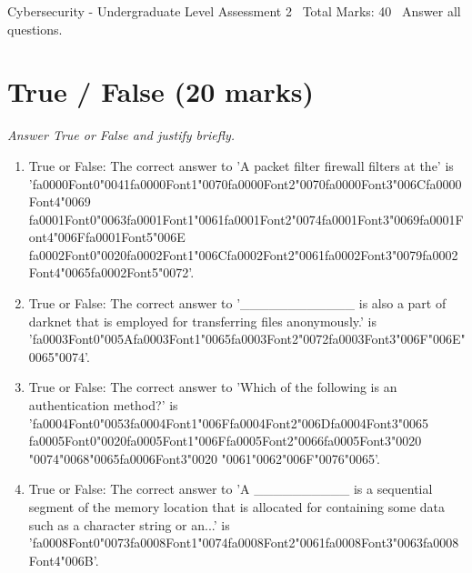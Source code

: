 \documentclass[12pt]{article}
\begin{document}
\begin{center}
Cybersecurity - Undergraduate Level Assessment 2 \
Total Marks: 40 \
Answer all questions.
\end{center}

\section*{True / False (20 marks)}
\textit{Answer True or False and justify briefly.}
\begin{enumerate}[label=\arabic*.]
\item True or False: The correct answer to 'A packet filter firewall filters at the' is '{\csname fa0000Font0\endcsname\char"0041}{\csname fa0000Font1\endcsname\char"0070}{\csname fa0000Font2\endcsname\char"0070}{\csname fa0000Font3\endcsname\char"006C}{\csname fa0000Font4\endcsname\char"0069} {\csname fa0001Font0\endcsname\char"0063}{\csname fa0001Font1\endcsname\char"0061}{\csname fa0001Font2\endcsname\char"0074}{\csname fa0001Font3\endcsname\char"0069}{\csname fa0001Font4\endcsname\char"006F}{\csname fa0001Font5\endcsname\char"006E} {\csname fa0002Font0\endcsname\char"0020}{\csname fa0002Font1\endcsname\char"006C}{\csname fa0002Font2\endcsname\char"0061}{\csname fa0002Font3\endcsname\char"0079}{\csname fa0002Font4\endcsname\char"0065}{\csname fa0002Font5\endcsname\char"0072}'.
\item True or False: The correct answer to '\_\_\_\_\_\_\_\_\_\_\_\_ is also a part of darknet that is employed for transferring files anonymously.' is '{\csname fa0003Font0\endcsname\char"005A}{\csname fa0003Font1\endcsname\char"0065}{\csname fa0003Font2\endcsname\char"0072}{\csname fa0003Font3\endcsname\char"006F}{\char"006E}{\char"0065}{\char"0074}'.
\item True or False: The correct answer to 'Which of the following is an authentication method?' is '{\csname fa0004Font0\endcsname\char"0053}{\csname fa0004Font1\endcsname\char"006F}{\csname fa0004Font2\endcsname\char"006D}{\csname fa0004Font3\endcsname\char"0065} {\csname fa0005Font0\endcsname\char"0020}{\csname fa0005Font1\endcsname\char"006F}{\csname fa0005Font2\endcsname\char"0066}{\csname fa0005Font3\endcsname\char"0020} {\char"0074}{\char"0068}{\char"0065}{\csname fa0006Font3\endcsname\char"0020} {\char"0061}{\char"0062}{\char"006F}{\char"0076}{\char"0065}'.
\item True or False: The correct answer to 'A \_\_\_\_\_\_\_\_\_\_ is a sequential segment of the memory location that is allocated for containing some data such as a character string or an...' is '{\csname fa0008Font0\endcsname\char"0073}{\csname fa0008Font1\endcsname\char"0074}{\csname fa0008Font2\endcsname\char"0061}{\csname fa0008Font3\endcsname\char"0063}{\csname fa0008Font4\endcsname\char"006B}'.

\end{enumerate}
\end{document}
